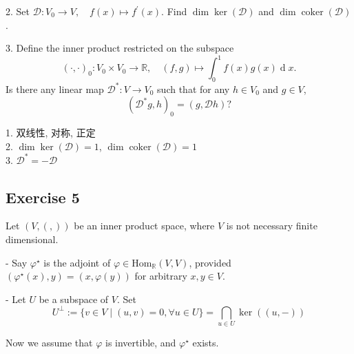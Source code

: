 \documentclass[11pt]{ctexart}
\theoremstyle{definition}
\numberwithin{equation}{section}
\theoremstyle{definition}
\theoremstyle{remark}
\begin{document}
2. Set $\mathscr D:V_0\to V,\quad f(x)\mapsto f^\prime (x)$. Find $\dim\ker(\mathscr D)$ and $\dim\operatorname{coker}(\mathscr D)$.

3. Define the inner product restricted on the subspace
   $$
   (\cdot ,\cdot )_0:V_0\times V_0\to \mathbb R,\quad (f,g)\mapsto \int_0^1 f(x)g(x)\operatorname d x.
   $$
   Is there any linear map $\mathscr D^\ast:V\to V_0$ such that for any $h\in V_0$ and $g\in V$,
   $$
    (\mathscr D^\ast g,h)_0=(g,\mathscr Dh)?
   $$
\begin{aaa}
    1. 双线性, 对称, 正定\\
    2. $\dim\ker(\mathscr D) = 1$, $\dim\operatorname{coker}(\mathscr D) = 1$\\
    3. $\mathscr D^\ast=-\mathscr D$
\end{aaa}
\subsection{Exercise 5}
Let $(V, (,))$ be an inner product space, where $V$ is not necessary finite dimensional.

- Say $\varphi ^\star$ is the adjoint of $\varphi \in \mathrm{Hom}_{\mathbb R}(V,V)$, provided $(\varphi^\star (x), y) = (x , \varphi (y))$ for arbitrary $x,y\in V$.

- Let $U$ be a subspace of $V$. Set
  $$
  U^\perp := \{v \in V \mid (u, v) = 0 , \forall u \in U\}  =\bigcap _{u \in U}\ker((u,-))
  $$

Now we assume that $\varphi$ is invertible, and $\varphi^\star$ exists.\\
\end{document}
